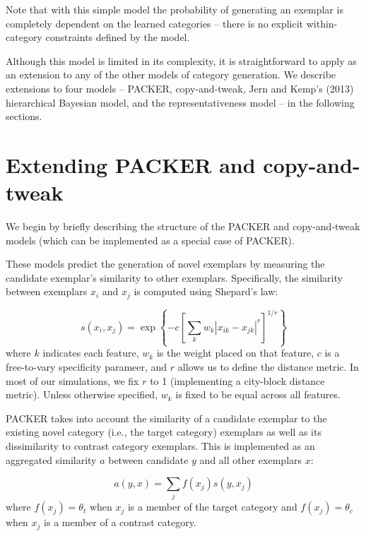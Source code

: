 \documentclass[12pt]{article} \usepackage[letterpaper, margin=1in,
\begin{document}

Note that with this simple model the probability of generating an exemplar is
completely dependent on the learned categories -- there is no explicit
within-category constraints defined by the model.


Although this model is limited in its complexity, it is straightforward to apply
as an extension to any of the other models of category generation. We describe
extensions to four models -- PACKER, copy-and-tweak, Jern and Kemp's (2013)
hierarchical Bayesian model, and the representativeness model -- in the following sections.

\section{Extending PACKER and copy-and-tweak}

We begin by briefly describing the structure of the PACKER and copy-and-tweak
models (which can be implemented as a special case of PACKER).

These models predict the generation of novel exemplars by measuring the
candidate exemplar's similarity to other exemplars. Specifically, the similarity
between exemplars $x_i$ and $x_j$ is computed using Shepard's law:

\begin{equation}
s\left(x_i,x_j\right) = \exp \left\{ -c \left[\sum_{k}{ w_k \left| x_{ik} - x_{jk} \right|^r }\right]^{1/r} \right\}
\label{eq:similarity}
\end{equation}
where $k$ indicates each feature, $w_k$ is the weight placed on that feature,
$c$ is a free-to-vary specificity parameer, and $r$ allows us to define the
distance metric. In most of our simulations, we fix $r$ to 1 (implementing a
city-block distance metric). Unless otherwise specified, $w_k$ is fixed to be
equal across all features.

PACKER takes into account the similarity of a candidate exemplar to the existing
novel category (i.e., the target category) exemplars as well as its
dissimilarity to contrast category exemplars. This is implemented as an
aggregated similarity $a$ between candidate $y$ and all other exemplars $x$:

\begin{equation}
  a(y, x) = \sum_j{f(x_j) s(y, x_j)}
\end{equation}
where $f(x_j) = \theta_t$ when $x_j$ is a member of the target category and
$f(x_j) = \theta_c$ when $x_j$ is a member of a contrast category. 
\end{document}

